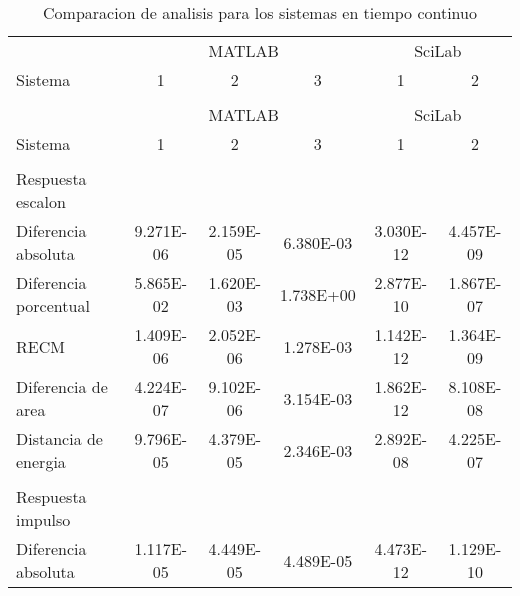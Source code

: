         {\setlength\LTleft{0pt}
        \setlength\LTright{0pt}
        \scriptsize
        \centering
        \renewcommand{\arraystretch}{0.87}
        \begin{longtable}{l @{\extracolsep{\fill}} ccccc}
            \caption[Comparacion de analisis - tiempo continuo]{Comparacion de analisis para los sistemas en tiempo continuo}
            \label{tab:AnalisisStepC} \\
            \toprule
                    & \multicolumn{3}{c}{MATLAB} & \multicolumn{2}{c}{SciLab}\\ \cmidrule{2-4}\cmidrule{5-6}
            Sistema &    1    &    2    &    3   &     1       &       2     \\ \cmidrule{2-2}\cmidrule{3-3}\cmidrule{4-4}\cmidrule{5-5}\cmidrule{6-6}
            & & & & & \\
            \endfirsthead
            \toprule
                    & \multicolumn{3}{c}{MATLAB} & \multicolumn{2}{c}{SciLab}\\ \cmidrule{2-4}\cmidrule{5-6}
            Sistema &    1    &    2    &    3   &     1       &       2     \\ \cmidrule{2-2}\cmidrule{3-3}\cmidrule{4-4}\cmidrule{5-5}\cmidrule{6-6}
            & & & & & \\
            \endhead
            Respuesta escalon      &  &  &  &  & \\ \cmidrule{1-1}
            Diferencia absoluta    & \num{9.271E-06} & \num{2.159E-05} & \num{6.380E-03} & \num{3.030E-12} & \num{4.457E-09}  \\
            Diferencia porcentual  & \num{5.865E-02} & \num{1.620E-03} & \num{1.738E+00} & \num{2.877E-10} & \num{1.867E-07}  \\
            RECM                   & \num{1.409E-06} & \num{2.052E-06} & \num{1.278E-03} & \num{1.142E-12} & \num{1.364E-09}  \\
            Diferencia de area     & \num{4.224E-07} & \num{9.102E-06} & \num{3.154E-03} & \num{1.862E-12} & \num{8.108E-08}  \\
            Distancia de energia   & \num{9.796E-05} & \num{4.379E-05} & \num{2.346E-03} & \num{2.892E-08} & \num{4.225E-07}  \\
            & & & & & \\
            Respuesta impulso      &  &  &  &  & \\ \cmidrule{1-1}
            Diferencia absoluta    & \num{1.117E-05} & \num{4.449E-05} & \num{4.489E-05} & \num{4.473E-12} & \num{1.129E-10}  \\

\end{longtable}}
